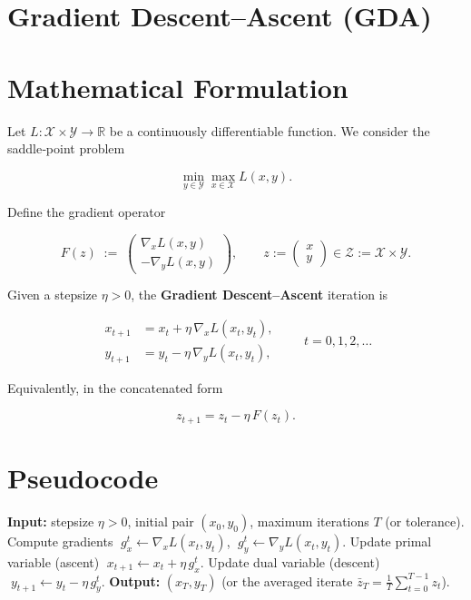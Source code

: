 \documentclass{article}
\begin{document}
\section*{Gradient Descent–Ascent (GDA)}

\section*{Mathematical Formulation}
Let $L:\mathcal X\times\mathcal Y\rightarrow\mathbb R$ be a continuously differentiable function.
We consider the saddle‑point problem  

\[
\min_{y\in\mathcal Y}\max_{x\in\mathcal X} L(x,y).
\]

Define the gradient operator  

\[
F(z)\;:=\;
\begin{pmatrix}
\nabla_{x}L(x,y)\\[2mm]
-\nabla_{y}L(x,y)
\end{pmatrix},
\qquad 
z:=\begin{pmatrix}x\\y\end{pmatrix}\in\mathcal Z:=\mathcal X\times\mathcal Y .
\]

Given a stepsize $\eta>0$, the \textbf{Gradient Descent–Ascent} iteration is  

\[
\boxed{
\begin{aligned}
x_{t+1}&=x_{t}+ \eta \,\nabla_{x}L(x_{t},y_{t}),\\
y_{t+1}&=y_{t}- \eta \,\nabla_{y}L(x_{t},y_{t}),
\end{aligned}}
\qquad  t=0,1,2,\dots
\tag{1}
\]

Equivalently, in the concatenated form  

\[
z_{t+1}=z_{t}-\eta\,F(z_{t}). \tag{2}
\]

\section*{Pseudocode}
\begin{algorithm}[H]
\caption{Gradient Descent–Ascent (GDA)}
\begin{algorithmic}[1]
\STATE \textbf{Input:} stepsize $\eta>0$, initial pair $(x_{0},y_{0})$,
maximum iterations $T$ (or tolerance).
    \STATE Compute gradients 
    $\;g_{x}^{t}\gets \nabla_{x}L(x_{t},y_{t})$,
    $\;g_{y}^{t}\gets \nabla_{y}L(x_{t},y_{t})$.
    \STATE Update primal variable (ascent) 
    $\;x_{t+1}\gets x_{t}+ \eta\, g_{x}^{t}$.
    \STATE Update dual variable (descent) 
    $\;y_{t+1}\gets y_{t}- \eta\, g_{y}^{t}$.
\ENDFOR
\STATE \textbf{Output:} $(x_{T},y_{T})$ (or the averaged iterate 
$\bar z_{T}= \frac1T\sum_{t=0}^{T-1}z_{t}$).
\end{algorithmic}
\end{algorithm}
\end{document}
